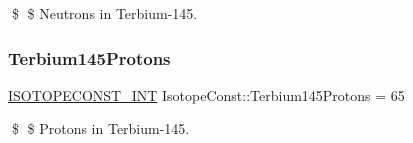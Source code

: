 \$ \$ Neutrons in Terbium-\/145. \mbox{\label{group___isotope_const-_terbium-_tb145_gafd1298d0911d2db89a78e8c5e085a47d}} 
\subsubsection{\texorpdfstring{Terbium145\+Protons}{Terbium145Protons}}
{\footnotesize\ttfamily \mbox{\hyperlink{group___isotope_const-_macros_ga5f18360b3e99483a35c32d789e62621c}{I\+S\+O\+T\+O\+P\+E\+C\+O\+N\+S\+T\+\_\+\+I\+NT}} Isotope\+Const\+::\+Terbium145\+Protons = 65}

\$ \$ Protons in Terbium-\/145. 